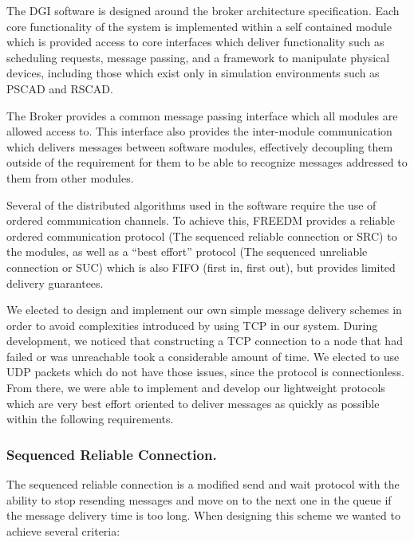 \documentclass{llncs}
\begin{document}
The DGI software is designed around the broker architecture specification. Each core functionality of the system is implemented within a self contained module which is provided access to core interfaces which deliver functionality such as scheduling requests, message passing, and a framework to manipulate physical devices, including those which exist only in simulation environments such as PSCAD\cite{PSCAD} and RSCAD\cite{RSCAD}.

The Broker provides a common message passing interface which all modules are allowed access to. This interface also provides the inter-module communication which delivers messages between software modules, effectively decoupling them outside of the requirement for them to be able to recognize messages addressed to them from other modules.

Several of the distributed algorithms used in the software require the use of ordered communication channels. To achieve this, FREEDM provides a reliable ordered communication protocol (The sequenced reliable connection or SRC) to the modules, as well as a ``best effort'' protocol (The sequenced unreliable connection or SUC) which is also FIFO (first in, first out), but provides limited delivery guarantees.

We elected to design and implement our own simple message delivery schemes in order to avoid complexities introduced by using TCP in our system. During development, we noticed that constructing a TCP connection to a node that had failed or was unreachable took a considerable amount of time. We elected to use UDP packets which do not have those issues, since the protocol is connectionless. From there, we were able to implement and develop our lightweight protocols which are very best effort oriented to deliver messages as quickly as possible within the following requirements.

\subsubsection{Sequenced Reliable Connection.}

The sequenced reliable connection is a modified send and wait protocol with the ability to stop resending messages and move on to the next one in the queue if the message delivery time is too long. When designing this scheme we wanted to achieve several criteria:
\end{document}
